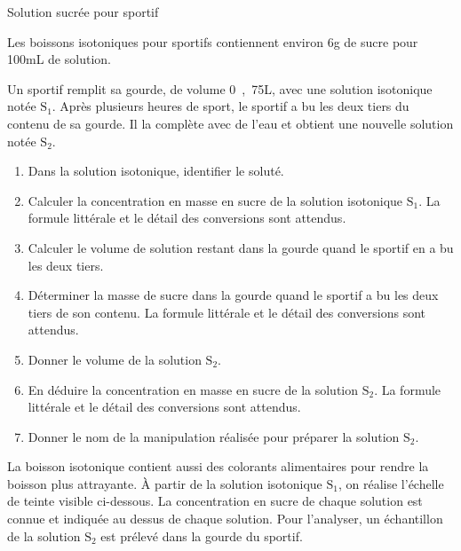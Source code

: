 \documentclass[12pt,a4paper]{article}
\begin{document}
\begin{exo}{Solution sucrée pour sportif}

Les boissons isotoniques pour sportifs contiennent environ \unit{6}{g} de sucre pour \unit{100}{mL} de solution.

Un sportif remplit sa gourde, de volume \unit{0{,}75}{L}, avec une solution isotonique notée $\mathrm{S_1}$. Après plusieurs heures de sport, le sportif a bu les deux tiers du contenu de sa gourde. Il la complète avec de l'eau et obtient une nouvelle solution notée $\mathrm{S_2}$.

\begin{enumerate}
\item \app{} 

Dans la solution isotonique, identifier le soluté. 

\item \app{}  \rea{} 

Calculer la concentration en masse en sucre de la solution isotonique $\mathrm{S_1}$.
La formule littérale et le détail des conversions sont attendus.

\item \rea{} 

Calculer le volume de solution restant dans la gourde quand le sportif en a bu les deux tiers.

\item \rea{} 

Déterminer la masse de sucre dans la gourde quand le sportif a bu les deux tiers de son contenu.
La formule littérale et le détail des conversions sont attendus.

\item \app{} 

Donner le volume de la solution $\mathrm{S_2}$.

\item \rea{} 
\label{quest:C2}

En déduire la concentration en masse en sucre de la solution $\mathrm{S_2}$.
La formule littérale et le détail des conversions sont attendus.

\item \app{} 

Donner le nom de la manipulation réalisée pour préparer la solution $\mathrm{S_2}$.

\end{enumerate}

La boisson isotonique contient aussi des colorants alimentaires pour rendre la boisson plus attrayante.
À partir de la solution isotonique $\mathrm{S_1}$, on réalise l'échelle de teinte visible ci-dessous.
La concentration en sucre de chaque solution est connue et indiquée au dessus de chaque solution.
Pour l'analyser, un échantillon de la solution $\mathrm{S_2}$ est prélevé dans la gourde du sportif.


\end{exo}
\end{document}
